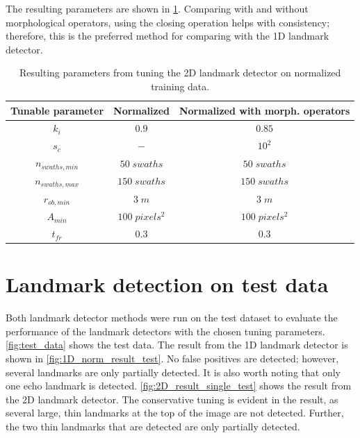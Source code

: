 The resulting parameters are shown in \cref{tab:2D_parameters}. Comparing with and without morphological operators, using the closing operation helps with consistency; therefore, this is the preferred method for comparing with the 1D landmark detector. 

\begin{table} [ht]
    \caption{Resulting parameters from tuning the 2D landmark detector on normalized training data.}
    \centering
    \begin{tabular}{ccc}
        \hline
        \textbf{Tunable parameter} & \textbf{Normalized} & \textbf{Normalized with morph. operators} \\ \hline
        $k_i$                      & $0.9$               & $0.85$                                    \\
        $s_c$                      & $-$                 & $10^2$                                    \\
        $n_{swaths, min}$          & $50 \; swaths$      & $50 \; swaths$                            \\
        $n_{swaths, max}$          & $150\; swaths$      & $150 \; swaths$                           \\
        $r_{ob, min}$              & $3 \; m$            & $3 \; m$                                  \\ 
        $A_{min}$                  & $100 \; pixels^2$   & $100 \; pixels^2$                         \\
        $t_{fr}$                   & $0.3$               & $0.3$                                     \\ \hline
        
    \end{tabular}
    \label{tab:2D_parameters}
\end{table}

\newpage

\section{Landmark detection on test data}

Both landmark detector methods were run on the test dataset to evaluate the performance of the landmark detectors with the chosen tuning parameters. \cref{fig:test_data} shows the test data. The result from the 1D landmark detector is shown in \cref{fig:1D_norm_result_test}. No false positives are detected; however, several landmarks are only partially detected. It is also worth noting that only one echo landmark is detected. \cref{fig:2D_result_single_test} shows the result from the 2D landmark detector. The conservative tuning is evident in the result, as several large, thin landmarks at the top of the image are not detected. Further, the two thin landmarks that are detected are only partially detected. 

